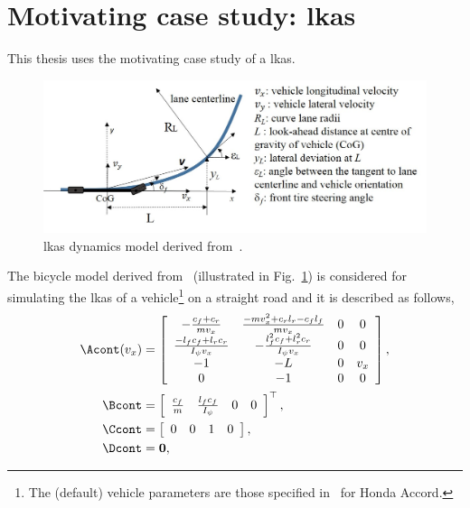 \section{Motivating case study: \texorpdfstring{\gls{lkas}}{lkas}}
\label{sec:lkas_case_Study}
This thesis uses the motivating case study of a \gls{lkas}.
\begin{figure}
\centerline{
    \includegraphics[width=\textwidth]{01_intro/images/model.jpg}
    }
    \vspace{-1em}
    \caption{\Gls{lkas} dynamics model derived from~\cite{kosecka1997vision}.}
    \label{fig:intro_model_lateral_control}
\end{figure}
The bicycle model derived from~\cite{kosecka1997vision} (illustrated in Fig.~\ref{fig:intro_model_lateral_control}) is considered for simulating the \gls{lkas} of a vehicle\footnote{The (default) vehicle parameters are those specified in~\cite{kosecka1997vision} for Honda Accord.} on a straight road and it is described as follows,
\begin{align*}
  \Acont (v_x)&= \left[
  \begin{array}{cccc}
    -\frac{c_{f}+c_{r}}{mv_{x}} & \frac{-mv_{x}^2+c_{r}l_{r}-c_{f}l_{f}}{mv_{x}} & 0  & 0\\
    \frac{-l_{f}c_{f}+l_{r}c_{r}}{I_{\psi}v_{x}} & -\frac{l_{f}^2c_{f}+l_{r}^2c_{r}}{I_{\psi}v_{x}} & 0 & 0\\
    -1 & -L & 0 & v_{x} \\
    0 & -1 & 0 & 0
  \end{array}
\right],\\ \Bcont &=\left[
  \begin{array}{cccc}
    \frac{c_{f}}{m} &
    \frac{l_{f}c_{f}}{I_{\psi}} &
    0&
    0
  \end{array}
\right]^{\top},\\ 
 \Ccont &=\left[
  \begin{array}{cccc}
    0 &
    0 &
    1&
    0
  \end{array}
\right], \\
\Dcont &=\textbf{0},
\end{align*}
